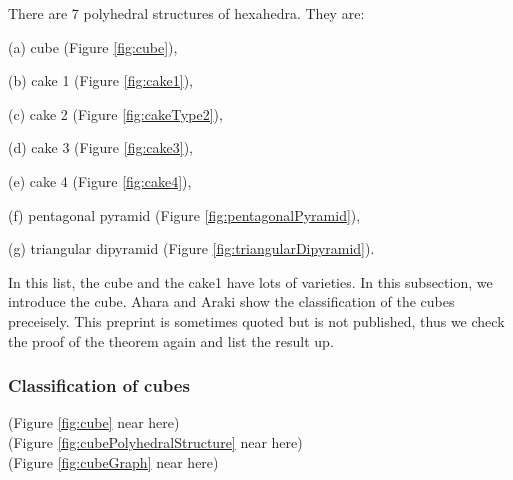 \documentclass[suppldata, dvipdfmx]{interact}
\theoremstyle{plain}%
\theoremstyle{definition}
\theoremstyle{remark}
\theoremstyle{problemstyle}
\begin{document}
There are 7 polyhedral structures of hexahedra.  They are:\par
(a) cube (Figure \ref{fig:cube}),\par
(b) cake 1 (Figure \ref{fig:cake1}),\par
(c) cake 2 (Figure \ref{fig:cakeType2}),\par
(d) cake 3 (Figure \ref{fig:cake3}),\par
(e) cake 4 (Figure \ref{fig:cake4}),\par
(f) pentagonal pyramid (Figure \ref{fig:pentagonalPyramid}),\par
(g) triangular dipyramid (Figure \ref{fig:triangularDipyramid}).\par

In this list, the cube and the cake1 have lots of varieties.  In this subsection, we introduce the cube.  Ahara and Araki \cite{AharaAraki2} show the classification of the cubes preceisely.  This preprint is sometimes quoted but is not published, thus we check the proof of the theorem again and list the result up.

\subsubsection{Classification of cubes}

\noindent(Figure \ref{fig:cube} near here)\\
(Figure \ref{fig:cubePolyhedralStructure} near here)\\
\noindent(Figure \ref{fig:cubeGraph}
 near here)
\end{document}
